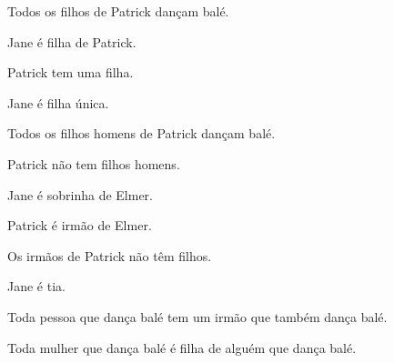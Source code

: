 \begin{compactlist}
\item Todos os filhos de Patrick dançam balé.
\item[] 
\item Jane é filha de Patrick.
\item[] 
\item Patrick tem uma filha.
\item[] 
\item Jane é filha única.
\item[] 
\item Todos os filhos homens de Patrick dançam balé.
\item[] 
\item Patrick não tem filhos homens.
\item[] 
\item Jane é sobrinha de Elmer.
\item[] 
\item Patrick é irmão de Elmer.
\item[] 
\item Os irmãos de Patrick não têm filhos.
\item[] 
\item Jane é tia.
\item[] 
\item Toda pessoa que dança balé tem um irmão que também dança balé.
\item[] 
\item Toda mulher que dança balé é filha de alguém que dança balé.
\item[] 
\end{compactlist}


